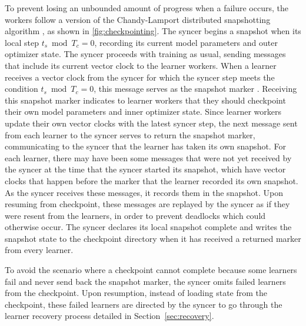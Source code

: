 \documentclass[11pt, a4paper, twocolumn, copyright, google]{google}
\begin{document}
To prevent losing an unbounded amount of progress when a failure occurs, the workers follow a version of the Chandy-Lamport distributed snapshotting algorithm \citep{chandy1985distributed}, as shown in \autoref{fig:checkpointing}. The syncer begins a snapshot when its local step $t_s \bmod T_c = 0$, recording its current model parameters and outer optimizer state. The syncer proceeds with training as usual, sending messages that include its current vector clock to the learner workers. When a learner receives a vector clock from the syncer for which the syncer step meets the condition $t_s \bmod T_c = 0$, this message serves as the snapshot marker \citep{chandy1985distributed}. Receiving this snapshot marker indicates to learner workers that they should checkpoint their own model parameters and inner optimizer state. Since learner workers update their own vector clocks with the latest syncer step, the next message sent from each learner to the syncer serves to return the snapshot marker, communicating to the syncer that the learner has taken its own snapshot. For each learner, there may have been some messages that were not yet received by the syncer at the time that the syncer started its snapshot, which have vector clocks that happen before the marker that the learner recorded its own snapshot. As the syncer receives these messages, it records them in the snapshot. Upon resuming from checkpoint, these messages are replayed by the syncer as if they were resent from the learners, in order to prevent deadlocks which could otherwise occur. The syncer declares its local snapshot complete and writes the snapshot state to the checkpoint directory when it has received a returned marker from every learner. 

To avoid the scenario where a checkpoint cannot complete because some learners fail and never send back the snapshot marker, the syncer omits failed learners from the checkpoint. Upon resumption, instead of loading state from the checkpoint, these failed learners are directed by the syncer to go through the learner recovery process detailed in Section~\ref{sec:recovery}.
\end{document}
